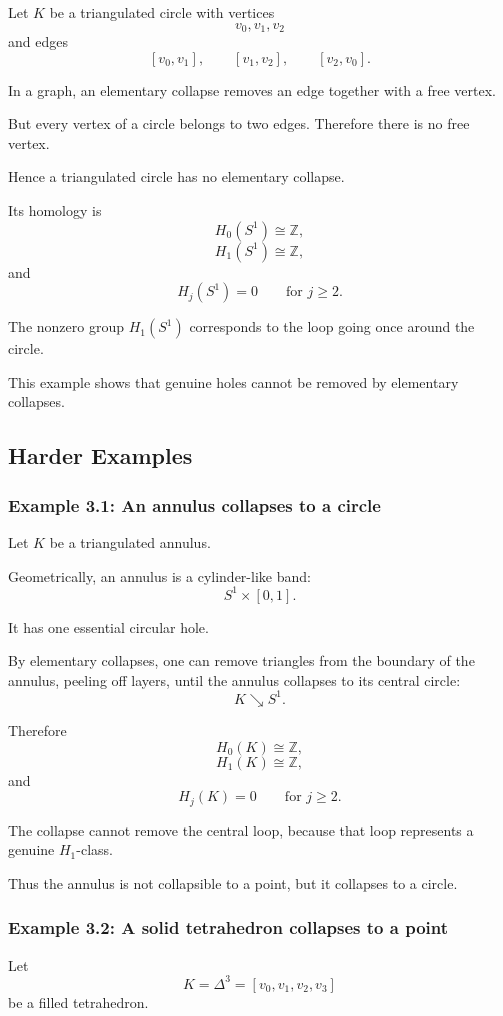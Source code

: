 \documentclass[12pt,a4paper]{article}
\theoremstyle{notespace}
\begin{document}
Let \(K\) be a triangulated circle with vertices
\[
v_0,v_1,v_2
\]
and edges
\[
[v_0,v_1],
\qquad
[v_1,v_2],
\qquad
[v_2,v_0].
\]

In a graph, an elementary collapse removes an edge together with a free vertex.

But every vertex of a circle belongs to two edges. Therefore there is no free vertex.

Hence a triangulated circle has no elementary collapse.

Its homology is
\[
H_0(S^1)\cong \mathbb Z,
\]
\[
H_1(S^1)\cong \mathbb Z,
\]
and
\[
H_j(S^1)=0
\qquad
\text{for }j\geq 2.
\]

The nonzero group \(H_1(S^1)\) corresponds to the loop going once around the circle.

This example shows that genuine holes cannot be removed by elementary collapses.

\subsection{Harder Examples}

\subsubsection{Example 3.1: An annulus collapses to a circle}

Let \(K\) be a triangulated annulus.

Geometrically, an annulus is a cylinder-like band:
\[
S^1\times [0,1].
\]

It has one essential circular hole.

By elementary collapses, one can remove triangles from the boundary of the annulus, peeling off layers, until the annulus collapses to its central circle:
\[
K\searrow S^1.
\]

Therefore
\[
H_0(K)\cong \mathbb Z,
\]
\[
H_1(K)\cong \mathbb Z,
\]
and
\[
H_j(K)=0
\qquad
\text{for }j\geq 2.
\]

The collapse cannot remove the central loop, because that loop represents a genuine \(H_1\)-class.

Thus the annulus is not collapsible to a point, but it collapses to a circle.

\subsubsection{Example 3.2: A solid tetrahedron collapses to a point}

Let
\[
K=\Delta^3=[v_0,v_1,v_2,v_3]
\]
be a filled tetrahedron.
\end{document}

